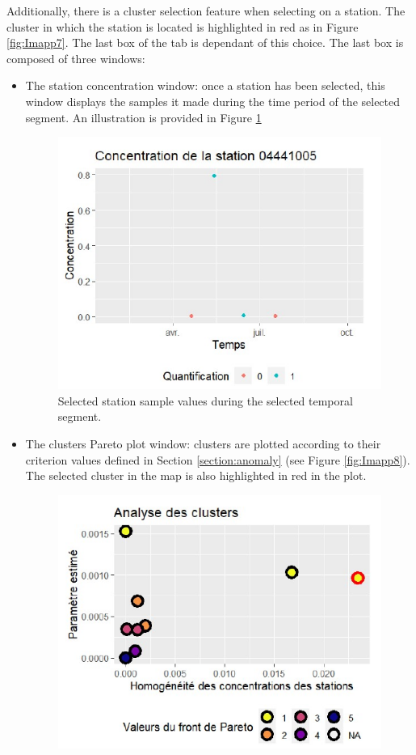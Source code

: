 Additionally, there is a cluster selection feature when selecting on a station. The cluster in which the station is located is highlighted in red as in Figure \ref{fig:Imapp7}. The last box of the tab is dependant of this choice. The last box is composed of three windows:   
\begin{itemize}
\item The station concentration window: once a station has been selected, this window displays the samples it made during the time period of the selected segment. An illustration is provided in Figure \ref{fig:Imapp9}
\begin{figure}[htbp]
 \centering
 \includegraphics[]{figs/Chap6/Im_appbis9.pdf}
 \caption{Selected station sample values during the selected temporal segment.}
 \label{fig:Imapp9}
\end{figure}
\item The clusters Pareto plot window: clusters are plotted according to their criterion values defined in Section \ref{section:anomaly} (see Figure \ref{fig:Imapp8}). The selected cluster in the map is also highlighted in red in the plot. 
\begin{figure}[htbp]
 \centering
 \includegraphics[]{figs/Chap6/Im_appbis8.pdf}

\end{figure}
\end{itemize}
